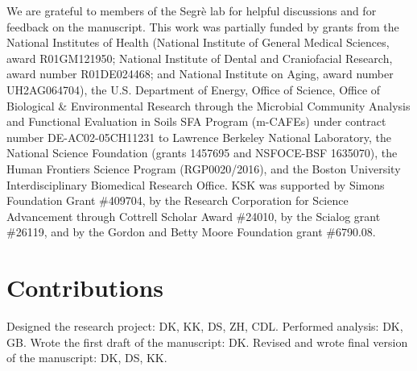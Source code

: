 \documentclass[letterpaper,12pt]{article}
\begin{document}
We are grateful to members of the Segrè lab for helpful discussions and for feedback on the manuscript. This work was partially funded by grants from the National Institutes of Health (National Institute of General Medical Sciences, award R01GM121950; National Institute of Dental and Craniofacial Research, award number R01DE024468; and National Institute on Aging, award number UH2AG064704), the U.S. Department of Energy, Office of Science, Office of Biological \& Environmental Research through the Microbial Community Analysis and Functional Evaluation in Soils SFA Program (m-CAFEs) under contract number DE-AC02-05CH11231 to Lawrence Berkeley National Laboratory, the National Science Foundation (grants 1457695 and NSFOCE-BSF 1635070), the Human Frontiers Science Program (RGP0020/2016), and the Boston University Interdisciplinary Biomedical Research Office.
KSK was supported by Simons Foundation Grant \#409704, by the Research Corporation for Science Advancement through Cottrell Scholar Award \#24010, by the Scialog grant \#26119, and by the Gordon and Betty Moore Foundation grant \#6790.08.

\section*{Contributions}
Designed the research project: DK, KK, DS, ZH, CDL. Performed analysis: DK, GB. Wrote the first draft of the manuscript: DK. Revised and wrote final version of the manuscript: DK, DS, KK.


\newpage
\singlespacing
\printbibliography


\end{document}
